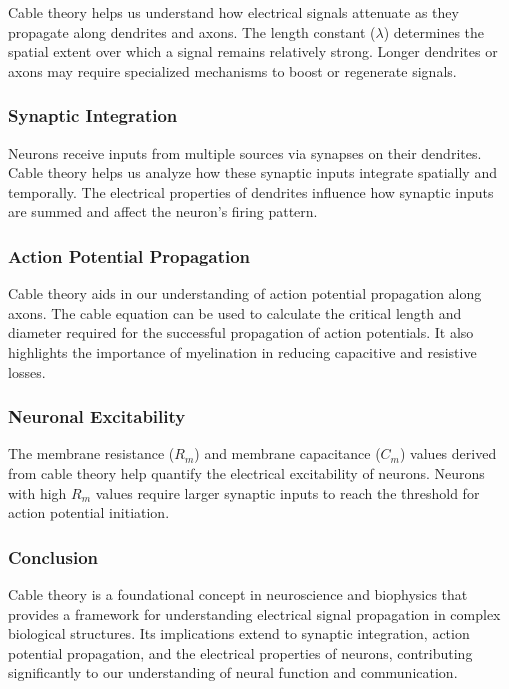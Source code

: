 \documentclass{article}
\begin{document}
Cable theory helps us understand how electrical signals attenuate as they propagate along dendrites and axons. The length constant (\(\lambda\)) determines the spatial extent over which a signal remains relatively strong. Longer dendrites or axons may require specialized mechanisms to boost or regenerate signals.

\subsubsection{Synaptic Integration}

Neurons receive inputs from multiple sources via synapses on their dendrites. Cable theory helps us analyze how these synaptic inputs integrate spatially and temporally. The electrical properties of dendrites influence how synaptic inputs are summed and affect the neuron's firing pattern.

\subsubsection{Action Potential Propagation}

Cable theory aids in our understanding of action potential propagation along axons. The cable equation can be used to calculate the critical length and diameter required for the successful propagation of action potentials. It also highlights the importance of myelination in reducing capacitive and resistive losses.

\subsubsection{Neuronal Excitability}

The membrane resistance (\(R_m\)) and membrane capacitance (\(C_m\)) values derived from cable theory help quantify the electrical excitability of neurons. Neurons with high \(R_m\) values require larger synaptic inputs to reach the threshold for action potential initiation.

\subsubsection{Conclusion}

Cable theory is a foundational concept in neuroscience and biophysics that provides a framework for understanding electrical signal propagation in complex biological structures. Its implications extend to synaptic integration, action potential propagation, and the electrical properties of neurons, contributing significantly to our understanding of neural function and communication.
\end{document}
